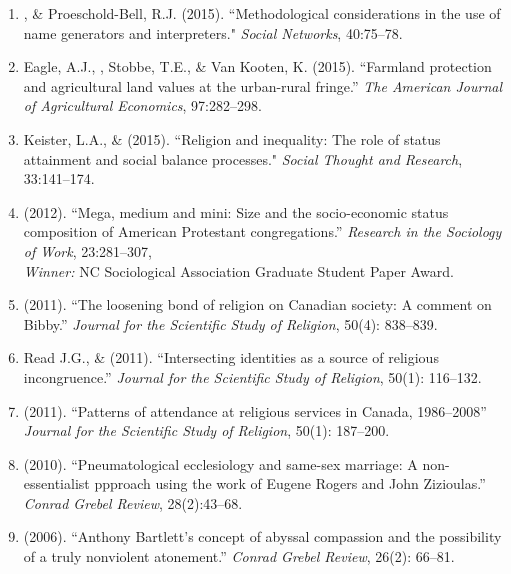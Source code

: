 \begin{enumerate}
\item \Eagle, \& Proeschold-Bell, R.J. (2015). ``Methodological considerations in the use of name generators and interpreters." \emph{Social Networks}, 40:75--78. 

\item Eagle, A.J., \Eagle, Stobbe, T.E., \& Van Kooten, K. (2015). ``Farmland protection and agricultural land values at the urban-rural fringe.'' \emph{The American Journal of Agricultural Economics}, 97:282--298. 

\item Keister, L.A., \& \Eagle \hspace{.01em} (2015). ``Religion and inequality: The role of status attainment and social balance processes." \emph{Social Thought and Research}, 33:141--174.

\item \Eagle \hspace{.01em} (2012). ``Mega, medium and mini: Size and the socio-economic status composition of American Protestant congregations.'' \emph{Research in the Sociology of Work}, 23:281--307, \\ \emph{Winner:} NC Sociological Association Graduate Student Paper Award.

\item \Eagle \hspace{.01em} (2011). ``The loosening bond of religion on Canadian society: A comment on Bibby.'' \emph{Journal for the Scientific Study of Religion}, 50(4): 838--839.

\item Read J.G., \& \Eagle \hspace{.01em} (2011). ``Intersecting identities as a source of religious incongruence.''  \emph{Journal for the Scientific Study of Religion}, 50(1): 116--132. 

\item \Eagle \hspace{.01em} (2011). ``Patterns of attendance at religious services in Canada, 1986--2008'' \emph{Journal for the Scientific Study of Religion}, 50(1): 187--200. 

\item \Eagle \hspace{.01em} (2010). ``Pneumatological ecclesiology and same-sex marriage: A non-essentialist ppproach using the work of Eugene Rogers and John Zizioulas.'' \emph{Conrad Grebel Review}, 28(2):43--68.

\item \Eagle\hspace{.01em} (2006). ``Anthony Bartlett's concept of abyssal compassion and the possibility of a truly nonviolent atonement.'' \emph{Conrad Grebel Review}, 26(2): 66--81.	

\end{enumerate}

